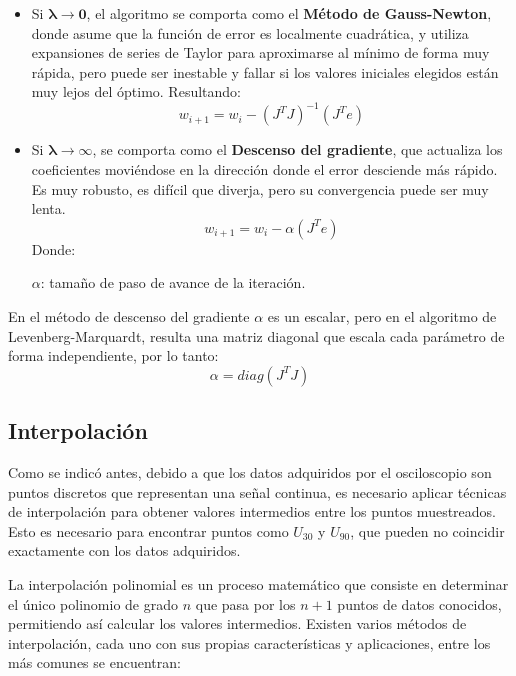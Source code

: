 \begin{itemize}[leftmargin=*]
    \item Si $\boldsymbol{\lambda \rightarrow 0}$, el algoritmo se comporta como el \textbf{Método de Gauss-Newton}, donde asume que la función de error es localmente cuadrática, y utiliza expansiones de series de Taylor para aproximarse al mínimo de forma muy rápida, pero puede ser inestable y fallar si los valores iniciales elegidos están muy lejos del óptimo. Resultando:
    \begin{equation}
        w_{i+1} = w_i - \left( J^T J \right)^{-1} (J^T e)
    \end{equation}
    \item Si $\boldsymbol{\lambda \rightarrow \infty}$, se comporta como el \textbf{Descenso del gradiente}, que  actualiza los coeficientes moviéndose en la dirección donde el error desciende más rápido. Es muy robusto, es difícil que diverja, pero su convergencia puede ser muy lenta.
    \begin{equation}
        w_{i+1} = w_i - \alpha (J^T e)
    \end{equation}
    Donde:

    $\alpha$: tamaño de paso de avance de la iteración.
\end{itemize}

En el método de descenso del gradiente $\alpha$ es un escalar, pero en el algoritmo de Levenberg-Marquardt, resulta una matriz diagonal que escala cada parámetro de forma independiente, por lo tanto:
\begin{equation}
    \alpha = diag(J^T J)
\end{equation}

\subsection{Interpolación}

Como se indicó antes, debido a que los datos adquiridos por el osciloscopio son puntos discretos que representan una señal continua, es necesario aplicar técnicas de interpolación \cite{Chapra2015} para obtener valores intermedios entre los puntos muestreados. Esto es necesario para encontrar puntos como $U_{30}$ y $U_{90}$, que pueden no coincidir exactamente con los datos adquiridos.

La interpolación polinomial es un proceso matemático que consiste en determinar el único polinomio de grado $n$ que pasa por los $n+1$ puntos de datos conocidos, permitiendo así calcular los valores intermedios. Existen varios métodos de interpolación, cada uno con sus propias características y aplicaciones, entre los más comunes se encuentran:

